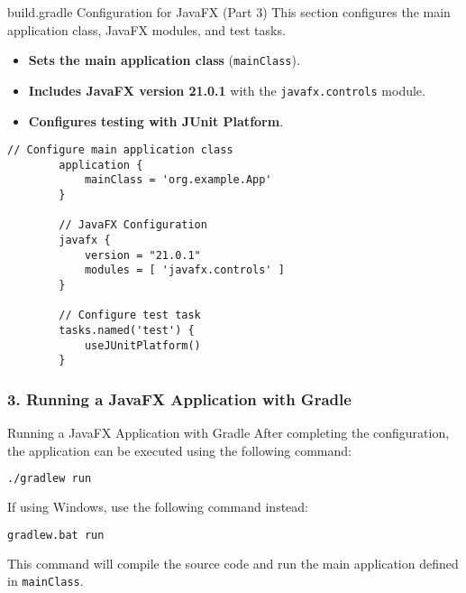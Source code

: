 \documentclass[aspectratio=169, table]{beamer}
\begin{document}
\begin{frame}[fragile]{build.gradle Configuration for JavaFX (Part 3)}
	\vspace{20pt}
	This section configures the main application class, JavaFX modules, and test tasks.
	\begin{itemize}
		\item \textbf{Sets the main application class} (\texttt{mainClass}).
		\item \textbf{Includes JavaFX version 21.0.1} with the \texttt{javafx.controls} module.
		\item \textbf{Configures testing with JUnit Platform}.
	\end{itemize}
	\begin{lstlisting}[style=JavaStyle]
		// Configure main application class
		application {
			mainClass = 'org.example.App'
		}
		
		// JavaFX Configuration
		javafx {
			version = "21.0.1"
			modules = [ 'javafx.controls' ]
		}
		
		// Configure test task
		tasks.named('test') {
			useJUnitPlatform()
		}
	\end{lstlisting}
\end{frame}


\subsubsection{3. Running a JavaFX Application with Gradle}

\begin{frame}[fragile]{Running a JavaFX Application with Gradle}
	\vspace{20pt}
	After completing the configuration, the application can be executed using the following command:
	
	\begin{lstlisting}[language=bash, caption=Running a JavaFX application with Gradle]
		./gradlew run
	\end{lstlisting}
	
	If using Windows, use the following command instead:
	
	\begin{lstlisting}[language=bash, caption=Running a Gradle project on Windows]
		gradlew.bat run
	\end{lstlisting}
	
	This command will compile the source code and run the main application defined in \texttt{mainClass}.
\end{frame}
\end{document}
